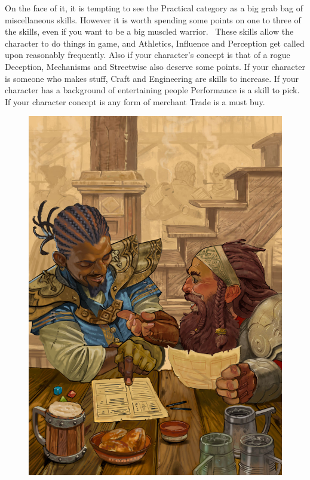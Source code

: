 On the face of it, it is tempting to see the Practical category as a big grab bag of miscellaneous skills. However it is worth spending some points on one to three of the skills, even if you want to be a big muscled warrior.  These skills allow the character to do things in game, and Athletics, Influence and Perception get called upon reasonably frequently. Also if your character’s concept is that of a rogue Deception, Mechanisms and Streetwise also deserve some points. If your character is someone who makes stuff, Craft and Engineering are skills to increase. If your character has a background of entertaining people Performance is a skill to pick. If your character concept is any form of merchant Trade is a must buy.


\begin{figure}%
\begin{center}
\includegraphics[scale=0.2]{img/character_creation_by_ncorva.jpg}
\end{center}
\end{figure}



